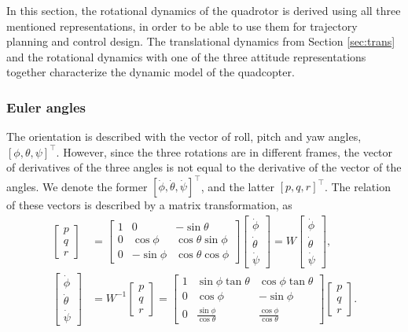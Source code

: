 In this section, the rotational dynamics of the quadrotor is derived using all three mentioned representations, in order to be able to use them for trajectory planning and control design. The translational dynamics from Section \ref{sec:trans} and the rotational dynamics with one of the three attitude representations together characterize the dynamic model of the quadcopter.

\subsubsection{Euler angles}
The orientation is described with the vector of roll, pitch and yaw angles, $[\phi,\theta,\psi]^\top$. However, since the three rotations are in different frames, the vector of derivatives of the three angles is not equal to the derivative of the vector of the angles. We denote the former $[\dot\phi,\dot\theta,\dot\psi]^\top$, and the latter $[p,q,r]^\top$. The relation of these vectors is described by a matrix transformation, as
\begin{align}
\begin{bmatrix} p\\q\\ r \end{bmatrix} &= \begin{bmatrix}
1 & 0 & -\sin\theta \\ 
0 & \cos\phi & \cos\theta\sin\phi \\ 
0 & -\sin\phi & \cos\theta\cos\phi
\end{bmatrix}\begin{bmatrix}
\dot\phi \\ \dot\theta \\ \dot\psi
\end{bmatrix} = W \begin{bmatrix}
\dot\phi \\ \dot\theta \\ \dot\psi
\end{bmatrix},\\
\begin{bmatrix}
\dot\phi \\ \dot\theta \\ \dot\psi
\end{bmatrix}&= W^{-1}\begin{bmatrix} p\\q\\ r \end{bmatrix} = \begin{bmatrix}
1 & \sin\phi\tan\theta & \cos\phi\tan\theta \\
0 & \cos\phi & -\sin\phi \\
0 & \frac{\sin\phi}{\cos\theta} & \frac{\cos\phi}{\cos\theta}
\end{bmatrix}\begin{bmatrix} p\\q\\ r \end{bmatrix}.\label{eq:angvel}
\end{align}

